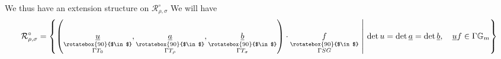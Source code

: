 We thus have an extension structure on $\mathcal R_{\rho,\sigma}^{\circ}$
We will have
\[
\mathcal R_{\rho,\sigma}^{\circ}=
\left\{\left(
\underset{\substack{\rotatebox{90}{$\in$}\\\Gamma T_0}}{\underline u},
\underset{\substack{\rotatebox{90}{$\in$}\\\Gamma T_\rho}}{\underline a},
\underset{\substack{\rotatebox{90}{$\in$}\\\Gamma T_\sigma}}{\underline b}
\right)\cdot
\underset{\substack{\rotatebox{90}{$\in$}\\\Gamma SG}}{f}
\ \middle|\ 
\det u=\det\underline a=\det\underline b,\quad
\underline u f\in\Gamma\mathbb G_m
\right\}
\]

\par{}